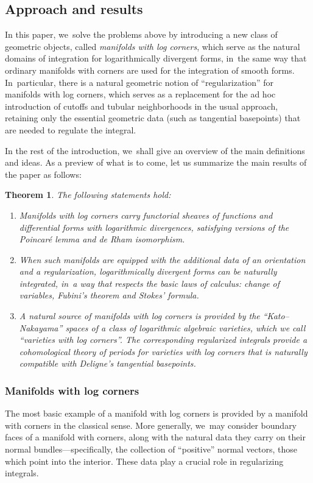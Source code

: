\documentclass[10pt]{amsart}
\newtheorem{theorem}{Theorem}[section]
\theoremstyle{definition}
\theoremstyle{remark}
\let\defn\emph
\begin{document}
\subsection{Approach and results}\label{sec:results}
In this paper, we~solve the problems above by introducing a new class of geometric objects, called \defn{manifolds with log corners}, which serve as the natural domains of integration for logarithmically divergent forms, in~the same way that ordinary manifolds with corners are used for the integration of smooth forms. In~particular, there is a natural geometric notion of ``regularization'' for manifolds with log corners, which serves as a replacement for the ad hoc introduction of cutoffs and tubular neighborhoods in the usual approach, retaining only the essential geometric data (such as tangential basepoints) that are needed to regulate the integral.

In the rest of the introduction, we~shall give an overview of the main definitions and ideas. As a preview of what is to come, let us summarize the main results of the paper as follows:

\begin{theorem}The following statements hold:
\begin{enumerate}
\item Manifolds with log corners carry functorial sheaves of functions and differential forms with logarithmic divergences, satisfying versions of the Poincaré lemma and de Rham isomorphism.
\item When such manifolds are equipped with the additional data of an orientation and a regularization, logarithmically divergent forms can be naturally integrated, in~a way that respects the basic laws of calculus: change of variables, Fubini's theorem and Stokes' formula.
\item A natural source of manifolds with log corners is provided by the ``Kato--Nakayama'' spaces of a class of logarithmic algebraic varieties, which we call ``varieties with log corners''. The corresponding regularized integrals provide a cohomological theory of periods for varieties with log corners that is naturally compatible with Deligne's tangential basepoints.
\end{enumerate}
\end{theorem}

\subsubsection{Manifolds with log corners}
The most basic example of a manifold with log corners is provided by a manifold with corners in the classical sense. More generally, we~may consider boundary faces of a manifold with corners, along with the natural data they carry on their normal bundles---specifically, the collection of ``positive'' normal vectors, \ie those which point into the interior. These data play a crucial role in regularizing integrals.
\end{document}
